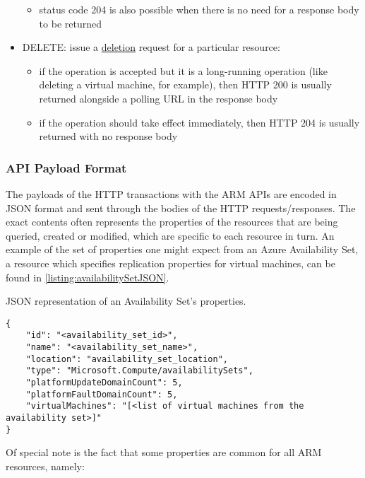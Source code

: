 \documentclass[11pt]{report}
\begin{document}
\begin{itemize}
\begin{itemize}
            \item{} status code 204 is also possible when there is no need for
                a response body to be returned
        \end{itemize}
    \item{DELETE}: issue a \ul{deletion} request for a particular resource:
        \begin{itemize}
            \item{} if the operation is accepted but it is a long-running
                operation (like deleting a virtual machine, for example), then
                HTTP 200 is usually returned alongside a polling URL in the
                response body
            \item{} if the operation should take effect immediately, then HTTP
                204 is usually returned with no response body
        \end{itemize}
\end{itemize}

\subsubsection{API Payload Format}

The payloads of the HTTP transactions with the ARM APIs are encoded in JSON
format and sent through the bodies of the HTTP requests/responses. The exact
contents often represents the properties of the resources that are being
queried, created or modified, which are specific to each resource in turn.
An example of the set of properties one might expect from an Azure
Availability Set, a resource which specifies replication properties for virtual
machines, can be found in \ref{listing:availabilitySetJSON}.

\begin{listing}[H]
\caption{JSON representation of an Availability Set's properties.}
\label{listing:availabilitySetJSON}
\begin{verbatim}
{
    "id": "<availability_set_id>",
    "name": "<availability_set_name>",
    "location": "availability_set_location",
    "type": "Microsoft.Compute/availabilitySets",
    "platformUpdateDomainCount": 5,
    "platformFaultDomainCount": 5,
    "virtualMachines": "[<list of virtual machines from the availability set>]"
}
\end{verbatim}
\end{listing}

Of special note is the fact that some properties are common for all ARM
resources, namely:
\end{document}
